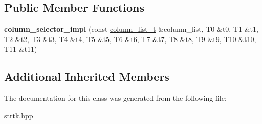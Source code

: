 \subsection*{Public Member Functions}
\begin{DoxyCompactItemize}
\item 
\hypertarget{classstrtk_1_1details_1_1column__selector__impl_aa3d723ca3b35382ed63613fa80b8292d}{{\bfseries column\-\_\-selector\-\_\-impl} (const \hyperlink{structstrtk_1_1details_1_1column__list__impl}{column\-\_\-list\-\_\-t} \&column\-\_\-list, T0 \&t0, T1 \&t1, T2 \&t2, T3 \&t3, T4 \&t4, T5 \&t5, T6 \&t6, T7 \&t7, T8 \&t8, T9 \&t9, T10 \&t10, T11 \&t11)}\label{classstrtk_1_1details_1_1column__selector__impl_aa3d723ca3b35382ed63613fa80b8292d}

\end{DoxyCompactItemize}
\subsection*{Additional Inherited Members}


The documentation for this class was generated from the following file\-:\begin{DoxyCompactItemize}
\item 
strtk.\-hpp\end{DoxyCompactItemize}
